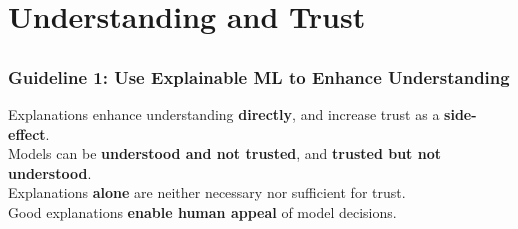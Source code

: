 \documentclass[11pt,
               aspectratio=169,
               hyperref={colorlinks}
               ]{beamer}
\begin{document}
	\section{Understanding and Trust}

	\subsection*{} %

	\begin{frame}
	
		\frametitle{\textbf{Guideline 1}: Use Explainable ML to Enhance Understanding}
		
		\Large
		
		Explanations enhance understanding \textbf{directly}, and increase trust as a \textbf{side-effect}.\\
		\vspace{10pt}
		Models can be \textbf{understood and not trusted}, and \textbf{trusted but not understood}.\\
		\vspace{10pt}
		Explanations \textbf{alone} are neither necessary nor sufficient for trust.\\
		\vspace{10pt}
		Good explanations \textbf{enable human appeal} of model decisions.
		
	\end{frame}
\end{document}
